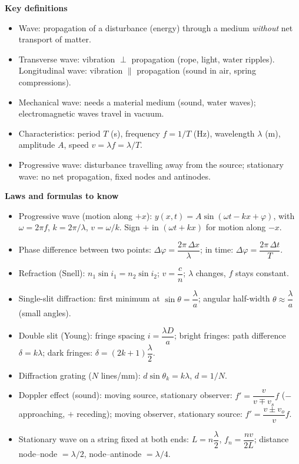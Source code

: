 \documentclass[11pt]{article}
\newcommand{\cle}[1]{{\popxbold\color{popdark}#1}}
\begin{document}
\begin{bilan}
\textbf{Key definitions}
\begin{itemize}
\item \cle{Wave}: propagation of a disturbance (energy) through a medium \emph{without} net transport of matter.
\item \cle{Transverse wave}: vibration $\perp$ propagation (rope, light, water ripples). \cle{Longitudinal wave}: vibration $\parallel$ propagation (sound in air, spring compressions).
\item \cle{Mechanical wave}: needs a material medium (sound, water waves); electromagnetic waves travel in vacuum.
\item Characteristics: period $T$ (s), frequency $f=1/T$ (Hz), wavelength $\lambda$ (m), amplitude $A$, speed $v=\lambda f=\lambda/T$.
\item \cle{Progressive wave}: disturbance travelling away from the source; \cle{stationary wave}: no net propagation, fixed nodes and antinodes.
\end{itemize}

\textbf{Laws and formulas to know}
\begin{itemize}
\item Progressive wave (motion along $+x$): $y(x,t)=A\sin(\omega t-kx+\varphi)$, with $\omega=2\pi f$, $k=2\pi/\lambda$, $v=\omega/k$. Sign $+$ in $(\omega t+kx)$ for motion along $-x$.
\item Phase difference between two points: $\Delta\varphi=\dfrac{2\pi\,\Delta x}{\lambda}$; in time: $\Delta\varphi=\dfrac{2\pi\,\Delta t}{T}$.
\item Refraction (Snell): $n_1\sin i_1=n_2\sin i_2$; $v=\dfrac{c}{n}$; $\lambda$ changes, $f$ stays constant.
\item Single-slit diffraction: first minimum at $\sin\theta=\dfrac{\lambda}{a}$; angular half-width $\theta\approx\dfrac{\lambda}{a}$ (small angles).
\item Double slit (Young): fringe spacing $i=\dfrac{\lambda D}{a}$; bright fringes: path difference $\delta=k\lambda$; dark fringes: $\delta=(2k+1)\dfrac{\lambda}{2}$.
\item Diffraction grating ($N$ lines/mm): $d\sin\theta_k=k\lambda$, $d=1/N$.
\item Doppler effect (sound): moving source, stationary observer: $f'=\dfrac{v}{v\mp v_s}f$ ($-$ approaching, $+$ receding); moving observer, stationary source: $f'=\dfrac{v\pm v_o}{v}f$.
\item Stationary wave on a string fixed at both ends: $L=n\dfrac{\lambda}{2}$, $f_n=\dfrac{nv}{2L}$; distance node--node $=\lambda/2$, node--antinode $=\lambda/4$.
\end{itemize}


\end{bilan}
\end{document}

